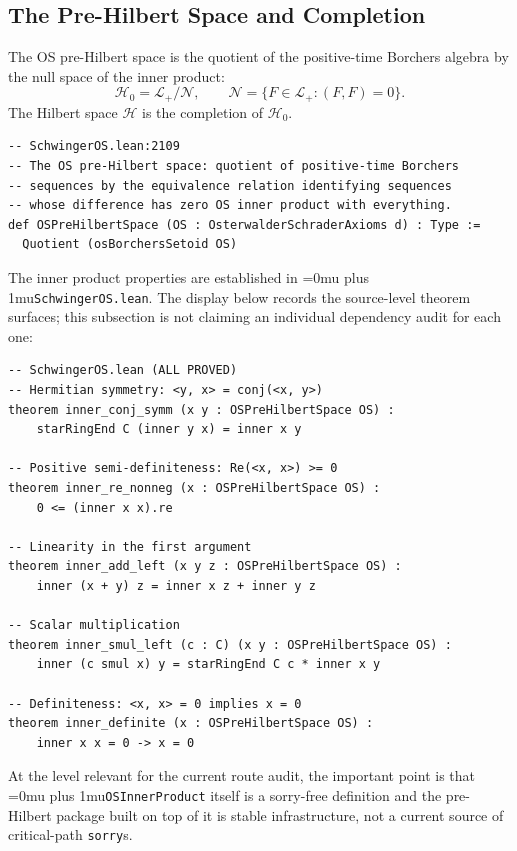 \documentclass[11pt,a4paper]{article}
\newcommand{\sorry}{\texttt{sorry}}
\newcommand{\leanfile}[1]{\begingroup\Urlmuskip=0mu plus 1mu\relax\nolinkurl{#1}\endgroup}
\newcommand{\leanname}[1]{\begingroup\Urlmuskip=0mu plus 1mu\relax\nolinkurl{#1}\endgroup}
\begin{document}
\subsection{The Pre-Hilbert Space and Completion}

The OS pre-Hilbert space is the quotient of the positive-time Borchers
algebra by the null space of the inner product:
\[
\mathscr{H}_0 = \mathscr{L}_+ / \mathscr{N},
\qquad
\mathscr{N} = \{F \in \mathscr{L}_+ : (F, F) = 0\}.
\]
The Hilbert space $\mathscr{H}$ is the completion of $\mathscr{H}_0$.

\begin{lstlisting}
-- SchwingerOS.lean:2109
-- The OS pre-Hilbert space: quotient of positive-time Borchers
-- sequences by the equivalence relation identifying sequences
-- whose difference has zero OS inner product with everything.
def OSPreHilbertSpace (OS : OsterwalderSchraderAxioms d) : Type :=
  Quotient (osBorchersSetoid OS)
\end{lstlisting}

The inner product properties are established in \leanfile{SchwingerOS.lean}. The
display below records the source-level theorem surfaces; this subsection is not
claiming an individual dependency audit for each one:

\begin{lstlisting}
-- SchwingerOS.lean (ALL PROVED)
-- Hermitian symmetry: <y, x> = conj(<x, y>)
theorem inner_conj_symm (x y : OSPreHilbertSpace OS) :
    starRingEnd C (inner y x) = inner x y

-- Positive semi-definiteness: Re(<x, x>) >= 0
theorem inner_re_nonneg (x : OSPreHilbertSpace OS) :
    0 <= (inner x x).re

-- Linearity in the first argument
theorem inner_add_left (x y z : OSPreHilbertSpace OS) :
    inner (x + y) z = inner x z + inner y z

-- Scalar multiplication
theorem inner_smul_left (c : C) (x y : OSPreHilbertSpace OS) :
    inner (c smul x) y = starRingEnd C c * inner x y

-- Definiteness: <x, x> = 0 implies x = 0
theorem inner_definite (x : OSPreHilbertSpace OS) :
    inner x x = 0 -> x = 0
\end{lstlisting}

\medskip\noindent
At the level relevant for the current route audit, the important point is that
\leanname{OSInnerProduct} itself is a sorry-free definition and the pre-Hilbert
package built on top of it is stable infrastructure, not a current source of
critical-path \sorry{}s.
\end{document}

